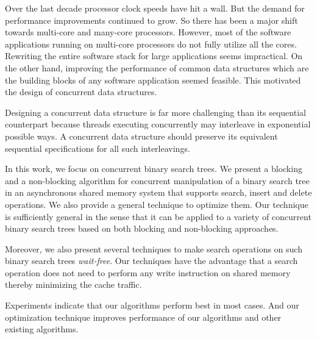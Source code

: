 Over the last decade processor clock speeds have hit a wall. But the demand for performance improvements continued to grow. So there has been a major shift towards multi-core and many-core processors. However, most of the software applications running on multi-core processors do not fully utilize all the cores. Rewriting the entire software stack for large applications seems impractical. On the other hand, improving the performance of common data structures which are the building blocks of any software application seemed feasible. This motivated the design of concurrent data structures. 

Designing a concurrent data structure is far more challenging than its sequential counterpart because threads executing concurrently may interleave in exponential possible ways. A concurrent data structure should preserve its equivalent sequential specifications for all such interleavings.

In this work, we focus on concurrent binary search trees. We present a blocking and a non-blocking algorithm for concurrent manipulation of a binary search tree in an asynchronous shared memory system that supports search, insert and delete operations. We also provide a general technique to optimize them. Our technique is sufficiently general in the sense that it can be applied to a variety of concurrent binary search trees based on both blocking and non-blocking approaches.

Moreover, we also present several techniques to make search operations on such binary search trees \emph{wait-free}. Our techniques have the advantage that a search operation does not need to perform any write instruction on shared memory thereby minimizing the cache traffic. 

Experiments indicate that our algorithms perform best in most cases. And our optimization technique improves performance of our algorithms and other existing algorithms. 
